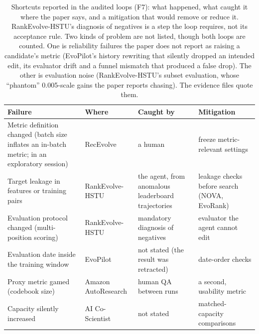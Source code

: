 \documentclass[sigconf,nonacm]{acmart}
\begin{document}
\begin{table}[t]
\caption{Shortcuts reported in the audited loops (F7): what happened, what caught it where the paper says, and a mitigation
that would remove or reduce it. RankEvolve-HSTU's diagnosis of negatives is a step the loop requires, not its
acceptance rule. Two kinds of problem are not listed, though both loops are counted. One is reliability failures the paper does not report as raising a
candidate's metric (EvoPilot's history rewriting that silently dropped an intended edit, its evaluator drift and a funnel
mismatch that produced a false drop). The other is evaluation noise (RankEvolve-HSTU's subset evaluation, whose ``phantom''
0.005-scale gains the paper reports chasing). The evidence files quote them.}\label{tab:failures}
\footnotesize
\begin{tabularx}{\columnwidth}{@{}>{\raggedright\arraybackslash\hsize=1.15\hsize}X>{\raggedright\arraybackslash\hsize=0.75\hsize}X>{\raggedright\arraybackslash\hsize=1.0\hsize}X>{\raggedright\arraybackslash\hsize=1.1\hsize}X@{}}
\toprule
Failure & Where & Caught by & Mitigation \\
\midrule
Metric definition changed (batch size inflates an in-batch metric; in an exploratory session) & RecEvolve & a human & freeze metric-relevant settings \\
Target leakage in features or training pairs & RankEvolve-HSTU & the agent, from anomalous leaderboard trajectories & leakage checks before search (NOVA, EvoRank) \\
Evaluation protocol changed (multi-position scoring) & RankEvolve-HSTU & mandatory diagnosis of negatives & evaluator the agent cannot edit \\
Evaluation date inside the training window & EvoPilot & not stated (the result was retracted) & date-order checks \\
Proxy metric gamed (codebook size) & Amazon AutoResearch & human QA between runs & a second, usability metric \\
Capacity silently increased & AI Co-Scientist & not stated & matched-capacity comparisons \\
\bottomrule
\end{tabularx}
\end{table}
\end{document}
